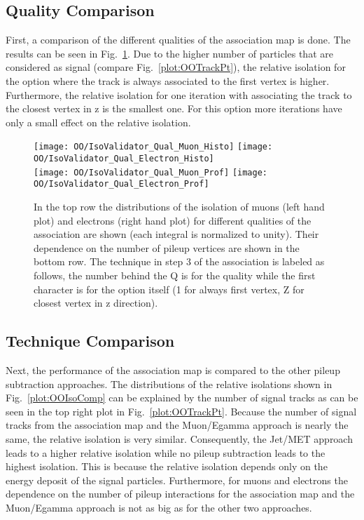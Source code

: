 \subsection{Quality Comparison \label{sec:OOIsoQual}}

First, a comparison of the different qualities of the association map is done. The results can be seen in Fig.~\ref{plot:OOIsoQual}. Due to the higher number of particles that are considered as signal (compare Fig.~\ref{plot:OOTrackPt}), the relative isolation for the option where the track is always associated to the first vertex is higher. Furthermore, the relative isolation for one iteration with associating the track to the closest vertex in z is the smallest one. For this option more iterations have only a small effect on the relative isolation. 

\begin{figure}[h!b]
  \centering
  \texttt{[image: OO/IsoValidator\_Qual\_Muon\_Histo]}
  \texttt{[image: OO/IsoValidator\_Qual\_Electron\_Histo]}
  \\
  \texttt{[image: OO/IsoValidator\_Qual\_Muon\_Prof]}
  \texttt{[image: OO/IsoValidator\_Qual\_Electron\_Prof]}
  \caption[Distributions of the isolation of muons and electrons and their dependencies on the number of pileup vertices for different qualities of the association]{In the top row the distributions of the isolation of muons (left hand plot) and electrons (right hand plot) for different qualities of the association are shown (each integral is normalized to unity). Their dependence on the number of pileup vertices are shown in the bottom row. The technique in step 3 of the association is labeled as follows, the number behind the Q is for the quality while the first character is for the option itself (1 for always first vertex, Z for closest vertex in z direction).  \label{plot:OOIsoQual}}
\end{figure}

\subsection{Technique Comparison \label{sec:OOIsoComp}}

Next, the performance of the association map is compared to the other pileup subtraction approaches. The distributions of the relative isolations shown in Fig.~\ref{plot:OOIsoComp} can be explained by the number of signal tracks as can be seen in the top right plot in Fig.~\ref{plot:OOTrackPt}. Because the number of signal tracks from the association map and the Muon/Egamma approach is nearly the same, the relative isolation is very similar. Consequently, the Jet/MET approach leads to a higher relative isolation while no pileup subtraction leads to the highest isolation. This is because the relative isolation depends only on the energy deposit of the signal particles. Furthermore, for muons and electrons the dependence on the number of pileup interactions for the association map and the Muon/Egamma approach is not as big as for the other two approaches.


